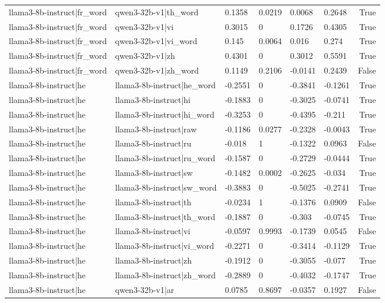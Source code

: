 \begin{table}
\begin{tabular}{llllllr}
llama3-8b-instruct|fr_word & qwen3-32b-v1|th_word & 0.1358 & 0.0219 & 0.0068 & 0.2648 & True \\
llama3-8b-instruct|fr_word & qwen3-32b-v1|vi & 0.3015 & 0 & 0.1726 & 0.4305 & True \\
llama3-8b-instruct|fr_word & qwen3-32b-v1|vi_word & 0.145 & 0.0064 & 0.016 & 0.274 & True \\
llama3-8b-instruct|fr_word & qwen3-32b-v1|zh & 0.4301 & 0 & 0.3012 & 0.5591 & True \\
llama3-8b-instruct|fr_word & qwen3-32b-v1|zh_word & 0.1149 & 0.2106 & -0.0141 & 0.2439 & False \\
llama3-8b-instruct|he & llama3-8b-instruct|he_word & -0.2551 & 0 & -0.3841 & -0.1261 & True \\
llama3-8b-instruct|he & llama3-8b-instruct|hi & -0.1883 & 0 & -0.3025 & -0.0741 & True \\
llama3-8b-instruct|he & llama3-8b-instruct|hi_word & -0.3253 & 0 & -0.4395 & -0.211 & True \\
llama3-8b-instruct|he & llama3-8b-instruct|raw & -0.1186 & 0.0277 & -0.2328 & -0.0043 & True \\
llama3-8b-instruct|he & llama3-8b-instruct|ru & -0.018 & 1 & -0.1322 & 0.0963 & False \\
llama3-8b-instruct|he & llama3-8b-instruct|ru_word & -0.1587 & 0 & -0.2729 & -0.0444 & True \\
llama3-8b-instruct|he & llama3-8b-instruct|sw & -0.1482 & 0.0002 & -0.2625 & -0.034 & True \\
llama3-8b-instruct|he & llama3-8b-instruct|sw_word & -0.3883 & 0 & -0.5025 & -0.2741 & True \\
llama3-8b-instruct|he & llama3-8b-instruct|th & -0.0234 & 1 & -0.1376 & 0.0909 & False \\
llama3-8b-instruct|he & llama3-8b-instruct|th_word & -0.1887 & 0 & -0.303 & -0.0745 & True \\
llama3-8b-instruct|he & llama3-8b-instruct|vi & -0.0597 & 0.9993 & -0.1739 & 0.0545 & False \\
llama3-8b-instruct|he & llama3-8b-instruct|vi_word & -0.2271 & 0 & -0.3414 & -0.1129 & True \\
llama3-8b-instruct|he & llama3-8b-instruct|zh & -0.1912 & 0 & -0.3055 & -0.077 & True \\
llama3-8b-instruct|he & llama3-8b-instruct|zh_word & -0.2889 & 0 & -0.4032 & -0.1747 & True \\
llama3-8b-instruct|he & qwen3-32b-v1|ar & 0.0785 & 0.8697 & -0.0357 & 0.1927 & False \\

\end{tabular}
\end{table}
